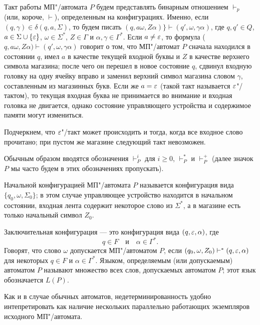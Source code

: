Такт работы МП"/автомата $P$ будем представлять бинарным отношением $\vdash_p$ (или, короче, $\vdash$), определенным на конфигурациях. Именно, если $(q,\gamma)\in\delta(q,a,\Sigma)$, то будем писать $(q,a\omega,Z\alpha)\}\vdash(q',\omega,\gamma\alpha)$, где $q,q'\in Q$, $a\in\Sigma\cup\{\varepsilon\}$, $\omega\in\Sigma^*$, $Z\in\Gamma$ и $\alpha,\gamma\in\Gamma^*$. Если $a\neq\varepsilon$, то формула ($q,a\omega,Z\alpha)\vdash(q',\omega,\gamma\alpha)$ говорит о том, что МП"/автомат $P$ сначала находился в состоянии $q$, имел $a$ в качестве текущей входной буквы и $Z$ в качестве верхнего символа магазина; после чего он перешел в новое состояние $q$, сдвинул входную головку на одну ячейку вправо и заменил верхний символ магазина словом $\gamma$, составленным из магазинных букв. Если же $a=\varepsilon$ (такой такт называется $\varepsilon$"/тактом), то текущая входная буква не принимается во внимание и входная головка не двигается, однако состояние управляющего устройства и содержимое памяти могут измениться.

Подчеркнем, что $\varepsilon$"/такт может происходить и тогда, когда все входное слово прочитано; при пустом же магазине следующий такт невозможен.

Обычным образом вводятся обозначения $\vdash_P^i$ для $i\ge 0$, $\vdash_P^*$ и $\vdash_P^+$ (далее значок $P$ мы часто будем в этих обозначениях пропускать).

Начальной конфигурацией МП"/автомата $P$ называется конфигурация вида $\{q_0,\omega,\Sigma_0\}$; в этом случае управляющее устройство находится в начальном состоянии, входная лента содержит некоторое слово из $\Sigma^*$, а в магазине есть только начальный символ $Z_0$.

Заключительная конфигурация --- это конфигурация вида $(q,\varepsilon,\alpha)$, где
\[
    q\in F \quad \text{и} \quad \alpha\in\Gamma^*.
\]
Говорят, что слово $\omega$ допускается
МП"/автоматом $P$, если $(q_0,\omega,Z_0)\vdash^*
(q,\varepsilon,\alpha)$ для некоторых $q\in F$ и
$\alpha\in\Gamma^*$. Языком, определяемым (или
допускаемым) автоматом $P$ называют множество всех
слов, допускаемых автоматом $P$; этот язык
обозначается $L(P)$.

Как и в случае обычных автоматов, недетерминированность удобно интепретировать как наличие нескольких параллельно работающих экземпляров исходного МП"/автомата.

